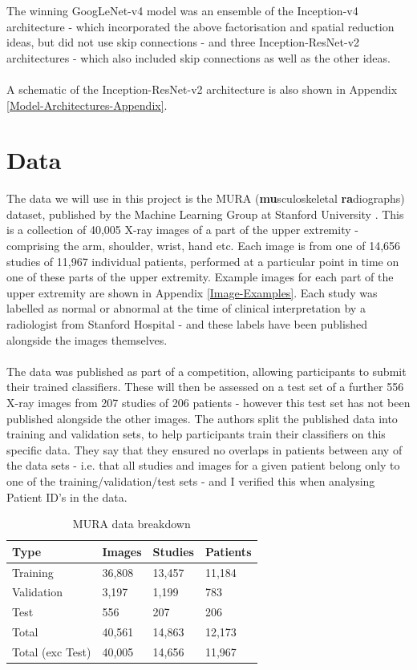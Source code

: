 \documentclass[11pt]{article} %
\theoremstyle{plain}
\theoremstyle{definition}
\begin{document}
The winning GoogLeNet-v4 model was an ensemble of the Inception-v4 architecture - which incorporated the above factorisation and spatial reduction ideas, but did not use skip connections - and three Inception-ResNet-v2 architectures - which also included skip connections as well as the other ideas. 
\\
\\
\noindent
A schematic of the Inception-ResNet-v2 architecture is also shown in Appendix \ref{Model-Architectures-Appendix}.


\newpage
\section{Data}
The data we will use in this project is the MURA (\textbf{mu}sculoskeletal \textbf{ra}diographs) dataset, published by the Machine Learning Group at Stanford University \cite{MURA2017}. This is a collection of 40,005 X-ray images of a part of the upper extremity - comprising the arm, shoulder, wrist, hand etc. Each image is from one of 14,656 studies of 11,967 individual patients, performed at a particular point in time on one of these parts of the upper extremity. Example images for each part of the upper extremity are shown in Appendix \ref{Image-Examples}. Each study was labelled as normal or abnormal at the time of clinical interpretation by a radiologist from Stanford Hospital - and these labels have been published alongside the images themselves. 
\\
\\
\noindent
The data was published as part of a competition, allowing participants to submit their trained classifiers. These will then be assessed on a test set of a further 556 X-ray images from 207 studies of 206 patients - however this test set has not been published alongside the other images. The authors split the published data into training and validation sets, to help participants train their classifiers on this specific data. They say that they ensured no overlaps in patients between any of the data sets - i.e. that all studies and images for a given patient belong only to one of the training/validation/test sets - and I verified this when analysing Patient ID's in the data.
\begin{table}[!ht]
\centering
\caption{MURA data breakdown}
\label{MURA_Breakdown_ByType}
\begin{tabular}{@{}llll@{}}
\toprule
Type & Images & Studies & Patients \\ \midrule
Training & 36,808 & 13,457 & 11,184 \\
Validation & 3,197 & 1,199 & 783 \\
Test & 556 & 207 & 206 \\
\bottomrule
Total & 40,561 & 14,863 & 12,173 \\
\hline
Total (exc Test) & 40,005 & 14,656 & 11,967 \\ \bottomrule
\end{tabular}
\end{table}
\end{document}
